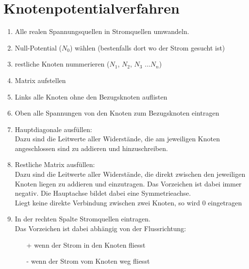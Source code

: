 



\newpage
\section{Knotenpotentialverfahren}
\begin{enumerate}
  \item Alle realen Spannungsquellen in Stromquellen umwandeln. 
  \item Null-Potential ($N_0$) wählen (bestenfalls dort wo der Strom gesucht ist)
  \item restliche Knoten nummerieren ($N_1$, $N_2$, $N_3$ ...$N_n$)
  \item Matrix aufstellen
  \item Links alle Knoten ohne den Bezugsknoten auflisten
  \item Oben alle Spannungen von den Knoten zum Bezugsknoten eintragen
  \item Hauptdiagonale ausfüllen: \\
  Dazu sind die Leitwerte aller Widerstände, die am jeweiligen Knoten angeschlossen sind zu addieren und hinzuschreiben. 
  \item Restliche Matrix ausfüllen: \\
  Dazu sind die Leitwerte aller Widerstände, die direkt zwischen den jeweiligen Knoten liegen zu addieren und einzutragen. Das Vorzeichen ist dabei immer negativ. Die Hauptachse bildet dabei eine Symmetrieachse. \\
  Liegt keine direkte Verbindung zwischen zwei Knoten, so wird 0 eingetragen
  \item In der rechten Spalte Stromquellen eintragen. \\
  Das Vorzeichen ist dabei abhängig von der Flussrichtung: \\
  \begin{itemize}
    \item[+] wenn der Strom in den Knoten fliesst
    \item[-] wenn der Strom vom Knoten weg fliesst
  \end{itemize}
\end{enumerate}

